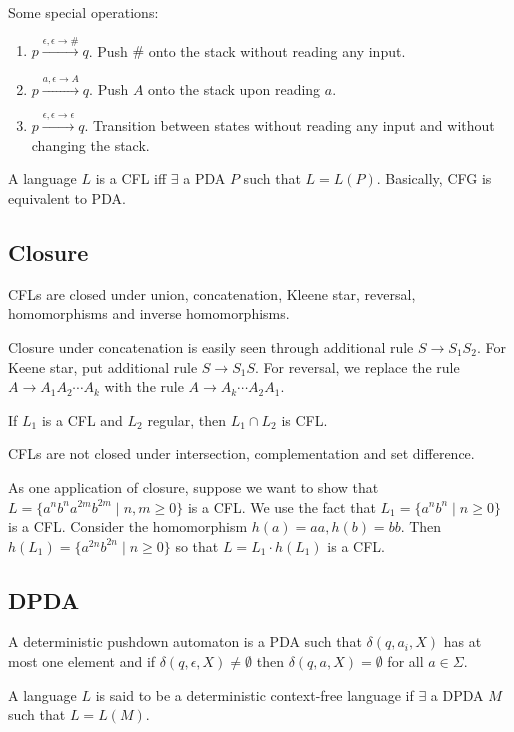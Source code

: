 \documentclass{article}
\begin{document}
Some special operations: 
\begin{enumerate}
\item\label{item:41} $\displaystyle p \xrightarrow{\epsilon, \epsilon \to \#} q$. Push $\#$ onto the stack without reading any input.
\item\label{item:42} $\displaystyle p \xrightarrow{a, \epsilon \to A} q$. Push $A$ onto the stack upon reading $a$. 
\item\label{item:43} $\displaystyle p \xrightarrow{\epsilon, \epsilon \to \epsilon} q$. Transition between states without reading any input and without changing the stack.
\end{enumerate}

A language $L$ is a CFL iff $\exists$ a PDA $P$ such that $L = L(P)$. Basically, CFG is equivalent to PDA.

\subsection{Closure}

CFLs are closed under union, concatenation, Kleene star, reversal, homomorphisms and inverse homomorphisms.

Closure under concatenation is easily seen through additional rule $S \to S_1S_2$. For Keene star, put additional rule $S \to S_1S$. For reversal, we replace the rule $A \to A_1A_2\cdots A_k$ with the rule $A \to A_k\cdots A_2A_1$.

If $L_1$ is a CFL and $L_2$ regular, then $L_1 \cap L_2$ is CFL.

CFLs are not closed under intersection, complementation and set difference.

As one application of closure, suppose we want to show that $L = \{ a^nb^na^{2m}b^{2m} \mid n, m \geq 0 \}$ is a CFL. We use the fact that $L_1 = \{ a^nb^n \mid n \geq 0 \}$ is a CFL. Consider the homomorphism $h(a) = aa, h(b) = bb$. Then $h(L_1) = \{ a^{2n}b^{2n} \mid n \geq 0 \}$ so that $L = L_1\cdot h(L_1)$ is a CFL.

\subsection{DPDA}

A deterministic pushdown automaton is a PDA such that $\delta(q, a_i, X)$ has at most one element and if $\delta(q, \epsilon, X) \ne \emptyset$ then $\delta(q, a, X) = \emptyset$ for all $a \in \Sigma$.

A language $L$ is said to be a deterministic context-free language if $\exists$ a DPDA $M$ such that $L = L(M)$.
\end{document}
